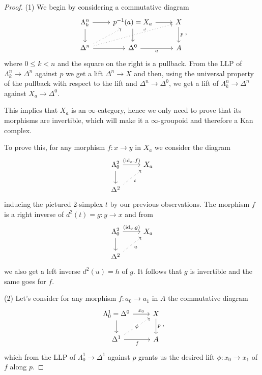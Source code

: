 \documentclass[a4paper,11pt,openany]{scrartcl}
\begin{document}
~\\
\begin{proof}
    (1) We begin by considering a commutative diagram
    \[\begin{tikzcd}
        {\Lambda^n_k} & {p^{-1}(a)=X_a} & X \\
        {\Delta^n} & {\Delta^0} & A
        \arrow["p", from=1-3, to=2-3]
        \arrow["a"', from=2-2, to=2-3]
        \arrow[from=1-2, to=1-3]
        \arrow[from=1-2, to=2-2]
        \arrow[from=2-1, to=2-2]
        \arrow[from=1-1, to=2-1]
        \arrow[from=1-1, to=1-2]
        \arrow[dotted, from=2-1, to=1-3]
        \arrow[dotted, from=2-1, to=1-2]
        \arrow["\lrcorner"{anchor=center, pos=0.01}, draw=none, from=1-2, to=2-3]
    \end{tikzcd},\]
    where $0\leq k<n$ and the square on the right is a pullback. From the LLP of
    $\Lambda^n_k\rightarrow\Delta^n$ against $p$ we get a lift
    $\Delta^n\rightarrow X$ and then, using the universal property of the
    pullback with respect to the lift and $\Delta^n\rightarrow\Delta^0$, we get
    a lift of $\Lambda^n_k\rightarrow\Delta^n$ against $X_a\rightarrow\Delta^0$.

    This implies that $X_a$ is an $\infty$-category, hence we only need to prove
    that its morphisms are invertible, which will make it a $\infty$-groupoid
    and therefore a Kan complex.

    To prove this, for any morphism $f\colon x\rightarrow y$ in $X_a$ we
    consider the diagram
    \[\begin{tikzcd}
        {\Lambda^2_0} & {X_a} \\
        {\Delta^2}
        \arrow["{(\id_x,f)}", from=1-1, to=1-2]
        \arrow[from=1-1, to=2-1]
        \arrow["t"', dotted, from=2-1, to=1-2]
    \end{tikzcd}\]
    inducing the pictured 2-simplex $t$ by our previous observations. The
    morphism $f$ is a right inverse of $d^2(t)=g\colon y\rightarrow x$ and from
    \[\begin{tikzcd}
        {\Lambda^2_0} & {X_a} \\
        {\Delta^2}
        \arrow["{(\id_y,g)}", from=1-1, to=1-2]
        \arrow[from=1-1, to=2-1]
        \arrow["u"', dotted, from=2-1, to=1-2]
    \end{tikzcd}\]
    we also get a left inverse $d^2(u)=h$ of $g$. It follows that $g$ is
    invertible and the same goes for $f$.

    (2) Let's consider for any morphism $f\colon a_0\rightarrow a_1$ in $A$ the
    commutative diagram
    \[\begin{tikzcd}
        {\Lambda^1_0=\Delta^0} & X \\
        {\Delta^1} & A
        \arrow["p", from=1-2, to=2-2]
        \arrow["f"', from=2-1, to=2-2]
        \arrow["{x_0}", from=1-1, to=1-2]
        \arrow[from=1-1, to=2-1]
        \arrow["{\phi}"{description}, dotted, from=2-1, to=1-2]
    \end{tikzcd},\]
    which from the LLP of $\Lambda^1_0\rightarrow\Delta^1$ against $p$ grants us
    the desired lift $\phi\colon x_0\rightarrow x_1$ of $f$ along $p$.


\end{proof}
\end{document}
